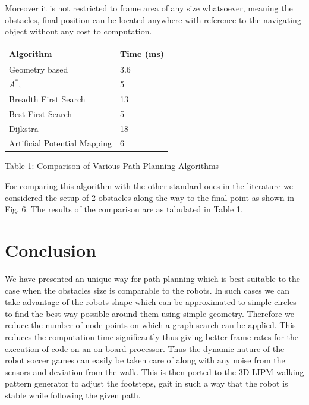 \documentclass[letterpaper, 10 pt, conference]{ieeeconf}  %
\begin{document}
 Moreover it is not restricted to frame area of any size whatsoever, meaning the obstacles, final position can be located anywhere with reference to the navigating object without any cost to computation.
 \\
 \begin{center} 
     \begin{tabular}{| p{3cm} | l | }
     \hline
     \textbf{Algorithm} & \textbf{Time (ms)}  \\ \hline
     Geometry based & 3.6 \\ \hline
     $A^{*}$,  & 5 \\ \hline
     Breadth First Search & 13 \\
     \hline
     Best First Search & 5   \\ \hline
     Dijkstra & 18 \\ \hline
     Artificial Potential Mapping & 6 \\ \hline
     \end{tabular}
 \end{center}
 \begin{center}
 \small{Table 1: Comparison of Various Path Planning Algorithms\\}
 \end{center}
For comparing this algorithm with the other standard ones in the literature we considered the setup of 2 obstacles along the way to the final point as shown in Fig. 6. The results of the comparison are as tabulated in Table 1.\\




\section{Conclusion}
We have presented an unique way for path planning which is best suitable to the case when the obstacles size is comparable to the robots. In such cases we can take advantage of the robots shape which can be approximated to simple circles to find the best way possible around them using simple geometry. Therefore we reduce the number of node points on which a graph search can be applied. This reduces the computation time significantly thus giving better frame rates for the execution of code on an on board processor. Thus the dynamic nature of the robot soccer games can easily be taken care of along with any noise from the sensors and deviation from the walk. This is then ported to the 3D-LIPM walking pattern generator to adjust the footsteps, gait in such a way that the robot is stable while following the given path. 
\\
 
\end{document}
